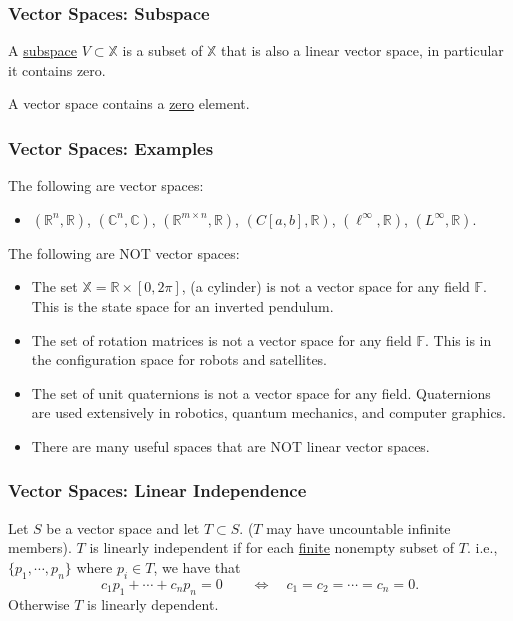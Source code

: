 \documentclass{beamer}
\begin{document}
\begin{frame}\frametitle{Vector Spaces: Subspace}

\begin{definition}[Subspace] A \underline{subspace} $V \subset \mathbb{X}$ is a subset of $\mathbb{X}$ that is also a linear vector space, in particular it contains zero.	
\end{definition}


\par{} A vector space contains a \underline{zero} element.	

\end{frame}

\begin{frame}\frametitle{Vector Spaces: Examples}


The following are vector spaces:
\begin{itemize}
\item $(\mathbb{R}^n, \mathbb{R})$, $(\mathbb{C}^n, \mathbb{C})$, $(\mathbb{R}^{m\times n}, \mathbb{R})$, $(C[a,b], \mathbb{R})$, $(\boldsymbol{\ell}^\infty, \mathbb{R})$, $(L^\infty, \mathbb{R})$.
\end{itemize}

The following are NOT vector spaces:
\begin{itemize}
\item 	The set $\mathbb{X}=\mathbb{R} \times [0,2\pi]$, (a cylinder) is not a vector space for any field $\mathbb{F}$.  This is the state space for an inverted pendulum.
\item The set of rotation matrices is not a vector space for any field $\mathbb{F}$.   This is in the configuration space for robots and satellites.\\
\item The set of unit quaternions is not a vector space for any field.  Quaternions are used extensively in robotics, quantum mechanics, and computer graphics.
\item There are many useful spaces that are NOT linear vector spaces.
\end{itemize}
\end{frame}

\begin{frame}\frametitle{Vector Spaces: Linear Independence}


Let $S$ be a vector space and let $T \subset S$.  ($T$ may have uncountable infinite members).  $T$ is linearly independent if for each \underline{finite} nonempty subset of $T$. i.e., $\{p_1,\cdots,p_n\}$ where $p_i\in T$, we have that 
\[
c_1p_1+\cdots+c_np_n=0 \qquad \iff \quad c_1=c_2=\cdots=c_n=0.
\]
Otherwise $T$ is linearly dependent.
\end{frame}
\end{document}

